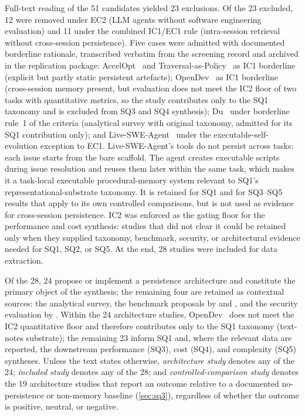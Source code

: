Full-text reading of the 51 candidates yielded 23 exclusions.
Of the 23 excluded, 12 were removed under EC2 (LLM agents without
software engineering evaluation) and 11 under the combined IC1/EC1 rule
(intra-session retrieval without cross-session persistence).
Five cases were admitted with documented borderline rationale,
transcribed verbatim from the screening record and archived in the
replication package:
AccelOpt~\citep{zhang2025accelopt} and Traversal-as-Policy~\citep{li2026traversalaspolicy}
as IC1 borderline (explicit but partly static persistent artefacts);
OpenDev~\citep{bui2026opendev} as IC1 borderline (cross-session memory
present, but evaluation does not meet the IC2 floor of two tasks with
quantitative metrics, so the study contributes only to the SQ1 taxonomy
and is excluded from SQ3 and SQ4 synthesis);
Du~\citep{du2026memory} under borderline rule~1 of the criteria
(analytical survey with original taxonomy, admitted for its SQ1
contribution only);
and Live-SWE-Agent~\citep{xia2025livesweagent} under the
executable-self-evolution exception to EC1.
Live-SWE-Agent's tools do not persist across tasks: each issue starts
from the bare scaffold.
The agent creates executable scripts during issue resolution and reuses
them later within the same task, which makes it a task-local executable
procedural-memory system relevant to SQ1's representational-substrate
taxonomy.
It is retained for SQ1 and for SQ3--SQ5 results that apply to its own
controlled comparisons, but is not used as evidence for cross-session
persistence.
IC2 was enforced as the gating floor for the performance and cost
synthesis: studies that did not clear it could be retained only when
they supplied taxonomy, benchmark, security, or architectural evidence
needed for SQ1, SQ2, or SQ5.
At the end, 28 studies were included for data extraction.

Of the 28, 24 propose or implement a persistence architecture and
constitute the primary object of the synthesis;
the remaining four are retained as contextual sources:
the \citet{du2026memory} analytical survey,
the benchmark proposals by \citet{deshpande2025memtrack} and
\citet{joshi2025swebenchcl}, and the security evaluation by
\citet{srivastava2025memorygraft}.
Within the 24 architecture studies, OpenDev~\citep{bui2026opendev} does
not meet the IC2 quantitative floor and therefore contributes only to
the SQ1 taxonomy (text-notes substrate);
the remaining 23 inform SQ1 and, where the relevant data are reported,
the downstream performance (SQ3), cost (SQ4), and complexity (SQ5)
syntheses.
Unless the text states otherwise, \emph{architecture study} denotes any
of the 24; \emph{included study} denotes any of the 28; and
\emph{controlled-comparison study} denotes the 19 architecture studies
that report an outcome relative to a documented no-persistence or
non-memory baseline (\autoref{sec:sq3}), regardless of whether the
outcome is positive, neutral, or negative.

